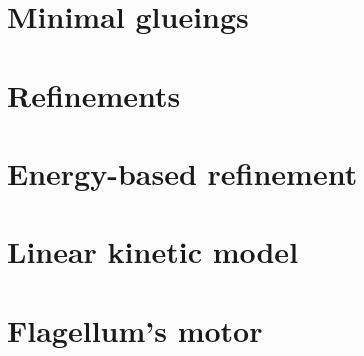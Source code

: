 \section{Minimal glueings}
\label{sec:mg}


\section{Refinements} %
\label{sec:gp}


\section{Energy-based refinement}
\label{sec:energy-gp}


\section{Linear kinetic model}
\label{sec:kinetic-model}

%
%


\section{Flagellum's motor}
\label{sec:alloring}




